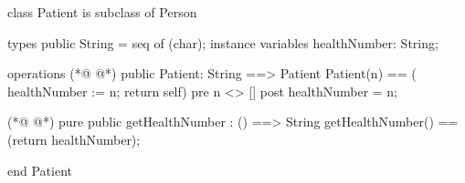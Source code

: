 \begin{vdmpp}[breaklines=true]
class Patient is subclass of Person

types
 public String = seq of (char);
instance variables
  healthNumber: String;
  
operations
(*@
\label{Patient:9}
@*)
 public Patient: String ==> Patient
  Patient(n) == ( healthNumber := n; return self)
 pre n <> []
 post healthNumber = n;
 
(*@
\label{getHealthNumber:14}
@*)
 pure public getHealthNumber : () ==> String
  getHealthNumber() == (return healthNumber);
  

end Patient
\end{vdmpp}
